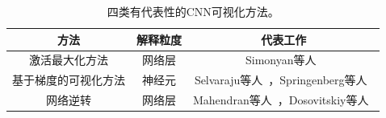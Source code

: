 \begin{table}[h]
	\centering
	\caption[四类有代表性的CNN可视化方法]{四类有代表性的CNN可视化方法。}
	\label{tab:typical_visualization_methods}
	\begin{tabular}{c|c|c}
		\toprule[2pt]
		方法 & 解释粒度 & 代表工作 \\ \midrule[2pt]
		激活最大化方法 & 网络层  & Simonyan等人~\cite{simonyan2013deep}  \\\hline
		基于梯度的可视化方法 &  神经元 & Selvaraju等人~\cite{selvaraju2017grad}，Springenberg等人~\cite{springenberg2014striving} \\  \hline
		网络逆转 & 网络层 &Mahendran等人~\cite{mahendran2015understanding, mahendran2016visualizing}，Dosovitskiy等人~\cite{dosovitskiy2016inverting}\\
		\bottomrule[2pt]
	\end{tabular}
	\label{tab:four_visulization_types}
\end{table}
\vspace{-0.4cm}
